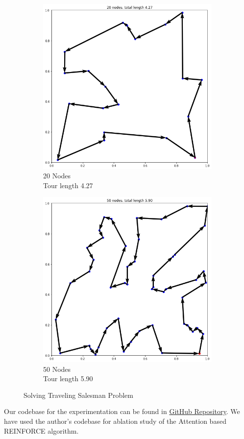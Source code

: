 \documentclass{article}
\theoremstyle{definition}
\begin{document}
\begin{figure}[H]
\captionsetup[subfigure]{justification=centering}
     \centering
    \begin{subfigure}{0.48\linewidth}
         \centering
         \includegraphics[width=0.65\linewidth]{images/learned_20.png}
         \caption{20 Nodes\\Tour length 4.27}
        \label{fig:bandit}
     \end{subfigure}
      \begin{subfigure}{0.48\linewidth}
         \centering
         \includegraphics[width=0.65\linewidth]{images/learned_50.png}
         \caption{50 Nodes\\Tour length 5.90}
     \end{subfigure}
     \caption{Solving Traveling Salesman Problem}
\end{figure}    

Our codebase for the experimentation can be found in \href{https://github.com/tejassp2002/CS769_Project}{GitHub Repository}. We have used the author's codebase for ablation study of the Attention based REINFORCE algorithm.



\end{document}
